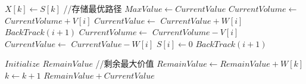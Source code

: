 \begin{breakablealgorithm}
	\caption{$BackTrack(i)$} 
	\begin{algorithmic}[1]
					\STATE $X[k] \gets S[k]$ //存储最优路径
				\ENDFOR
				\STATE $MaxValue \gets CurrentValue$
			\ENDIF
			\RETURN
		\ENDIF
			\STATE $CurrentVolume \gets$ $CurrentVolume + V[i]$
			\STATE $CurrentValue \gets$ $CurrentValue + W[i]$
			\STATE $BackTrack(i+1)$
			\STATE $CurrentVolume \gets$ $CurrentVolume - V[i]$
			\STATE $CurrentValue \gets$ $CurrentValue - W[i]$
		\ENDIF
			\STATE $S[i]\gets 0$
			\STATE $BackTrack(i+1)$
		\ENDIF
	\end{algorithmic}
\end{breakablealgorithm}
\begin{breakablealgorithm}
	\caption{$Bound(i)$} 
	\begin{algorithmic}[1]
		\STATE $Initialize$ $RemainValue$ //剩余最大价值
		\WHILE {$k \leq n$}
			\STATE $RemainValue \gets RemainValue+W[k]$
			\STATE $k\gets k+1$
		\ENDWHILE
		\RETURN $RemainValue+CurrentValue$
	\end{algorithmic}
\end{breakablealgorithm}
